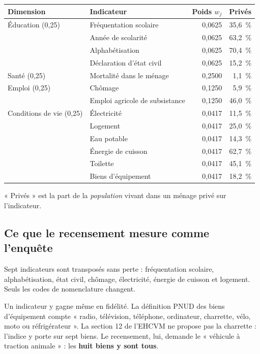 \documentclass[11pt,a4paper]{article}
\begin{document}
\begin{center}
\small
\begin{tabular}{@{}l>{\RaggedRight}p{5.0cm}r r@{}}
\toprule
\textbf{Dimension} & \textbf{Indicateur} & \textbf{Poids $w_j$} & \textbf{Privés} \\
\midrule
Éducation (0,25) & Fréquentation scolaire & 0,0625 & 35,6~\% \\
                 & Année de scolarité & 0,0625 & 63,2~\% \\
                 & Alphabétisation & 0,0625 & 70,4~\% \\
                 & Déclaration d'état civil & 0,0625 & 15,2~\% \\
\addlinespace
Santé (0,25) & Mortalité dans le ménage & 0,2500 & 1,1~\% \\
\addlinespace
Emploi (0,25) & Chômage & 0,1250 & 5,9~\% \\
              & Emploi agricole de subsistance & 0,1250 & 46,0~\% \\
\addlinespace
Conditions de vie (0,25) & Électricité & 0,0417 & 11,5~\% \\
                         & Logement & 0,0417 & 25,0~\% \\
                         & Eau potable & 0,0417 & 14,3~\% \\
                         & Énergie de cuisson & 0,0417 & 62,7~\% \\
                         & Toilette & 0,0417 & 45,1~\% \\
                         & Biens d'équipement & 0,0417 & 18,2~\% \\
\bottomrule
\end{tabular}
\end{center}

\noindent « Privés » est la part de la \emph{population} vivant dans un ménage privé sur
l'indicateur.

\subsection{Ce que le recensement mesure comme l'enquête}

Sept indicateurs sont transposés sans perte : fréquentation scolaire, alphabétisation, état civil,
chômage, électricité, énergie de cuisson et logement. Seuls les codes de nomenclature changent.

Un indicateur y gagne même en fidélité. La définition PNUD des biens d'équipement compte
« radio, télévision, téléphone, ordinateur, charrette, vélo, moto ou réfrigérateur ». La section 12
de l'EHCVM ne propose pas la charrette : l'indice y porte sur sept biens. Le recensement, lui,
demande le « véhicule à traction animale » : les \textbf{huit biens y sont tous}.
\end{document}
